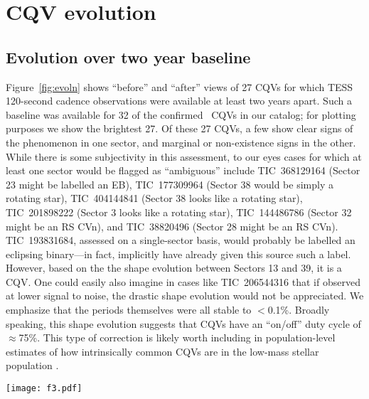 \documentclass[11pt,twocolumn,tighten]{aastex63}
\begin{document}
\section{CQV evolution}
\label{sec:evoln}

\subsection{Evolution over two year baseline}

Figure~\ref{fig:evoln} shows ``before'' and ``after'' views of 27 CQVs
for which TESS 120-second cadence observations were available at least
two years apart.  Such a baseline was available for 32 of the
confirmed \ngoods\ CQVs in our catalog; for plotting purposes we show
the brightest 27.
Of these 27 CQVs, a few show clear signs of the phenomenon in one
sector, and marginal or non-existence signs in the other.
While there is some subjectivity in this assessment, to our eyes cases
for which at least one sector would be flagged as ``ambiguous''
include
TIC~368129164 (Sector 23 might be labelled an EB),
TIC~177309964 (Sector 38 would be simply a rotating star),
TIC~404144841 (Sector 38 looks like a rotating star),
TIC~201898222 (Sector 3 looks like a rotating star),
TIC~144486786 (Sector 32 might be an RS CVn),
and
TIC~38820496 (Sector 28 might be an RS CVn).
TIC~193831684, assessed on a single-sector basis, would probably be
labelled an eclipsing binary---in fact, \citet{2021ApJ...912..123J}
implicitly have already given this source such a label.  However, based on the
the shape evolution between Sectors 13 and 39, it is a CQV.
One could easily also imagine in cases like TIC~206544316 that if
observed at lower signal to noise, the drastic shape evolution would
not be appreciated.  We emphasize that the periods themselves were all
stable to $<$0.1\%.  Broadly speaking, this shape evolution suggests
that CQVs have an ``on/off'' duty cycle of $\approx$75\%.  This type
of correction is likely worth including in population-level estimates
of how intrinsically common CQVs are in the low-mass stellar
population \citep[e.g.][]{2022AJ....163..144G}.


\begin{figure*}[!tp]
	\begin{center}
		\centering
		\texttt{[image: f3.pdf]}
		\vspace{-0.6cm}
		\caption{
		{\bf CQVs keep their periods but change their shapes.}
      32 of our \ngoods\ CQVs from Figure~\ref{fig:cqvs} had
      120-second cadence TESS data available for a baseline of at
      least two years; the 27 brightest are shown here.  Each panel
      shows one sector of TESS data, and is phased to its deepest
      minimum in flux.  Each panel's title shows the TIC identifier
      and approximate period in hours.  Text insets show the TESS
      sector numbers, which generally span two years, or at least
      1{,}000 cycles.  The vertical scale is fixed across sectors to
      clarify shape changes.
		}
		\label{fig:evoln}
	\end{center}
\end{figure*}
\end{document}
